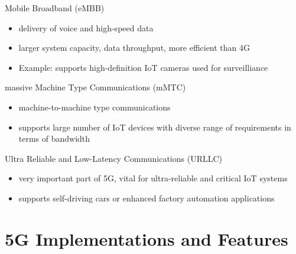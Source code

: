 \documentclass{beamer}
\begin{document}
\begin{frame}{Mobile Broadband (eMBB)}
  \vspace*{1.6em}
  \begin{itemize}
    \item delivery of voice and high-speed data
    \vspace*{0.75em}
    \item larger system capacity, data throughput, more efficient than 4G
    \vspace*{0.75em}
    \item Example: supports high-definition IoT cameras used for surveilliance
  \end{itemize}
\end{frame}

\begin{frame}{massive Machine Type Communications (mMTC)}
  \vspace*{1.6em}
  \begin{itemize}
    \item machine-to-machine type communications
    \vspace*{0.75em}
    \item supports large number of IoT devices with diverse range of requirements in terms of bandwidth
  \end{itemize}
\end{frame}

\begin{frame}{Ultra Reliable and Low-Latency Communications (URLLC)}
  \vspace*{1.6em}
  \begin{itemize}
    \item very important part of 5G, vital for ultra-reliable and critical IoT systems
    \vspace*{0.75em}
    \item supports self-driving cars or enhanced factory automation applications
  \end{itemize}
\end{frame}

\section[5G Implementations and Features]{5G Implementations and Features}
\end{document}
